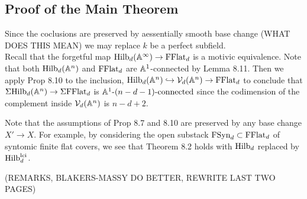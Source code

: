 \documentclass[12pt]{article}
\begin{document}
\subsection{Proof of the Main Theorem}

Since the coclusions are preserved by aessentially smooth base change (WHAT DOES THIS MEAN) we may replace $k$ be a perfect subfield. 
\bigskip\\
Recall that the forgetful map $\mathrm{Hilb}_d(\mathbb{A}^{\infty}) \to \mathrm{FFlat}_d$ is a motivic equivalence. Note that both $\mathrm{Hilb}_d(\mathbb{A}^n)$ and $\mathrm{FFlat}_d$ are $\mathbb{A}^1$-connected by Lemma 8.11. Then we apply Prop 8.10 to the inclusion, $\mathrm{Hilb}_d(\mathbb{A}^n) \hookrightarrow \mathcal{V}_d(\mathbb{A}^n) \to \mathrm{FFlat}_d$ to conclude that $\Sigma \mathrm{Hilb}_d(\mathbb{A}^n) \to \Sigma \mathrm{FFlat}_d$ is $\mathbb{A}^1\text{-}(n-d-1)\text{-connected}$ since the codimension of the complement inside $\mathcal{V}_d(\mathbb{A}^n)$ is $n - d + 2$.


\begin{rmk}
Note that the assumptions of Prop 8.7 and 8.10 are preserved by any base change $X' \to X$. For example, by considering the open substack $\mathrm{FSyn}_d \subset \mathrm{FFlat}_d$ of syntomic finite flat covers, we see that Theorem 8.2 holds with $\mathrm{Hilb}_d$ replaced by $\mathrm{Hilb}_d^{\text{lci}}$.
\end{rmk}

(REMARKS, BLAKERS-MASSY DO BETTER, REWRITE LAST TWO PAGES)
\end{document}

